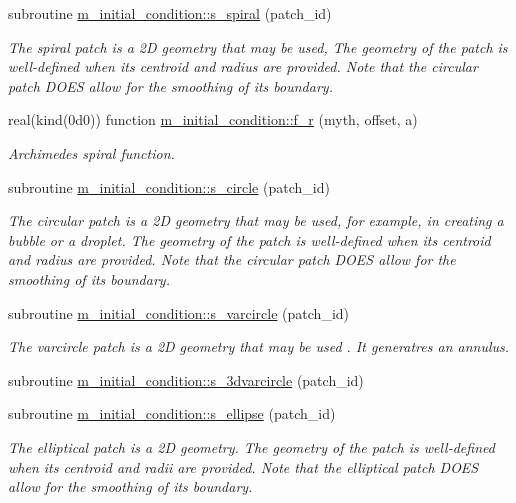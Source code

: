 \begin{DoxyCompactItemize}
subroutine \hyperlink{namespacem__initial__condition_ac4540baa01372eb3df51b268769fa6fc}{m\+\_\+initial\+\_\+condition\+::s\+\_\+spiral} (patch\+\_\+id)
\begin{DoxyCompactList}\small\item\em The spiral patch is a 2D geometry that may be used, The geometry of the patch is well-\/defined when its centroid and radius are provided. Note that the circular patch D\+O\+ES allow for the smoothing of its boundary. \end{DoxyCompactList}\item 
real(kind(0d0)) function \hyperlink{namespacem__initial__condition_a6bd15d72ae72d7c598bbc3b57cf0b90e}{m\+\_\+initial\+\_\+condition\+::f\+\_\+r} (myth, offset, a)
\begin{DoxyCompactList}\small\item\em Archimedes spiral function. \end{DoxyCompactList}\item 
subroutine \hyperlink{namespacem__initial__condition_a75d13cb7c7c4f88e8b532cf7e7dda498}{m\+\_\+initial\+\_\+condition\+::s\+\_\+circle} (patch\+\_\+id)
\begin{DoxyCompactList}\small\item\em The circular patch is a 2D geometry that may be used, for example, in creating a bubble or a droplet. The geometry of the patch is well-\/defined when its centroid and radius are provided. Note that the circular patch D\+O\+ES allow for the smoothing of its boundary. \end{DoxyCompactList}\item 
subroutine \hyperlink{namespacem__initial__condition_a3e1c1480513e75b444ce7a77ed0fe598}{m\+\_\+initial\+\_\+condition\+::s\+\_\+varcircle} (patch\+\_\+id)
\begin{DoxyCompactList}\small\item\em The varcircle patch is a 2D geometry that may be used . It generatres an annulus. \end{DoxyCompactList}\item 
subroutine \hyperlink{namespacem__initial__condition_aea2bf07e8890b1a108f2f891609174c9}{m\+\_\+initial\+\_\+condition\+::s\+\_\+3dvarcircle} (patch\+\_\+id)
\item 
subroutine \hyperlink{namespacem__initial__condition_a5e999ad19f23f5f2b059b80e49c0a086}{m\+\_\+initial\+\_\+condition\+::s\+\_\+ellipse} (patch\+\_\+id)
\begin{DoxyCompactList}\small\item\em The elliptical patch is a 2D geometry. The geometry of the patch is well-\/defined when its centroid and radii are provided. Note that the elliptical patch D\+O\+ES allow for the smoothing of its boundary. \end{DoxyCompactList}\item 

\end{DoxyCompactItemize}
